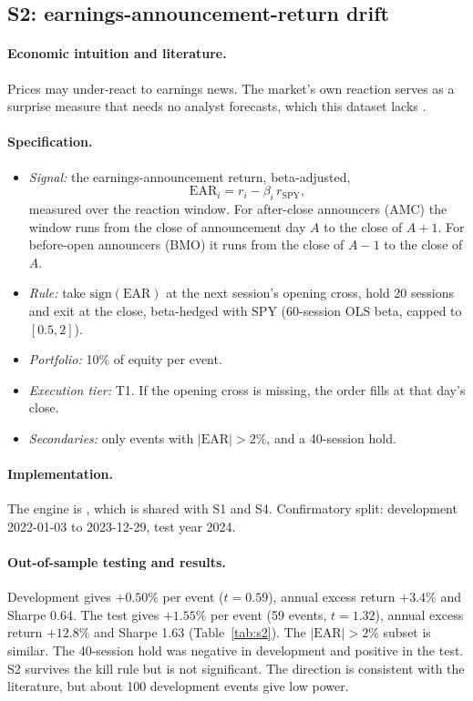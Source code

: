 \documentclass[../main.tex]{subfiles}
\begin{document}
\subsection{S2: earnings-announcement-return drift}\label{sec:s2}

\paragraph{Economic intuition and literature.}
Prices may under-react to earnings news. The market's own reaction serves as a surprise measure that needs no analyst forecasts, which this dataset lacks \citep{brandt2008,chan1996}.

\paragraph{Specification.}
\begin{itemize}
\item \emph{Signal:} the earnings-announcement return, beta-adjusted,
\begin{equation}
\mathrm{EAR}_i = r_i - \beta_i \, r_{\mathrm{SPY}},
\end{equation}
measured over the reaction window. For after-close announcers (AMC) the window runs from the close of announcement day $A$ to the close of $A+1$. For before-open announcers (BMO) it runs from the close of $A-1$ to the close of $A$.
\item \emph{Rule:} take $\mathrm{sign}(\mathrm{EAR})$ at the next session's opening cross, hold 20 sessions and exit at the close, beta-hedged with SPY (60-session OLS beta, capped to $[0.5, 2]$).
\item \emph{Portfolio:} 10\% of equity per event.
\item \emph{Execution tier:} T1. If the opening cross is missing, the order fills at that day's close.
\item \emph{Secondaries:} only events with $|\mathrm{EAR}| > 2\%$, and a 40-session hold.
\end{itemize}

\paragraph{Implementation.}
The engine is , which is shared with S1 and S4. Confirmatory split: development 2022-01-03 to 2023-12-29, test year 2024.

\paragraph{Out-of-sample testing and results.}
Development gives $+0.50\%$ per event ($t = 0.59$), annual excess return $+3.4\%$ and Sharpe 0.64. The test gives $+1.55\%$ per event (59 events, $t = 1.32$), annual excess return $+12.8\%$ and Sharpe 1.63 (Table~\ref{tab:s2}). The $|\mathrm{EAR}| > 2\%$ subset is similar. The 40-session hold was negative in development and positive in the test. S2 survives the kill rule but is not significant. The direction is consistent with the literature, but about 100 development events give low power.
\end{document}
